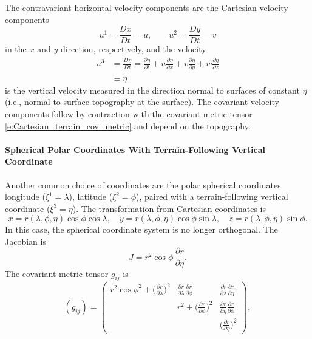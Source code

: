 \documentclass{report}
\begin{document}

The contravariant horizontal velocity components are the Cartesian velocity components 
\[
u^1 = \frac{Dx}{Dt} = u, \qquad u^2 = \frac{Dy}{Dt} = v
\]
in the $x$ and $y$ direction, respectively, and the velocity
\begin{align*}
u^3 & = \frac{D\eta}{Dt} 
 = \frac{\partial \eta}{\partial t} + u \frac{\partial \eta}{\partial x} + v \frac{\partial \eta}{\partial y} + w \frac{\partial \eta}{\partial z}\\
 & \equiv \dot \eta
\end{align*}
is the vertical velocity measured in the direction normal to surfaces of constant $\eta$ (i.e., normal to surface topography at the surface). The covariant velocity components follow by contraction with the covariant metric tensor \eqref{e:Cartesian_terrain_cov_metric} and depend on the topography.

\paragraph{Spherical Polar Coordinates With Terrain-Following Vertical Coordinate} Another common choice of coordinates are the polar spherical coordinates longitude ($\xi^1 = \lambda$), latitude ($\xi^2 = \phi$), paired with a terrain-following vertical coordinate ($\xi^3 = \eta$). 
The transformation from Cartesian coordinates is
\[
x = r(\lambda, \phi, \eta)\cos\phi\cos\lambda, \quad y=r(\lambda, \phi, \eta)\cos\phi\sin\lambda, \quad z=r(\lambda, \phi, \eta)\sin\phi.
\]
In this case, the spherical coordinate system is no longer orthogonal. The Jacobian is \citep{Staniforth03a}
\[
J=  r^2 \cos\phi \, \frac{\partial r}{\partial \eta}.
\]
The covariant metric tensor $g_{ij}$ is 
\begin{equation}\label{e:spherical_terrain_cov_metric}
    (g_{ij}) = \left(
    \begin{matrix}
    r^2\cos\phi^2 + \big(\frac{\partial r}{\partial \lambda}\big)^2 &
    \frac{\partial r}{\partial \lambda}\frac{\partial r}{\partial \phi}& 
    \frac{\partial r}{\partial \lambda}\frac{\partial r}{\partial \eta} \\
   & 
   r^2 + \big(\frac{\partial r}{\partial \phi}\big)^2& 
   \frac{\partial r}{\partial \eta}\frac{\partial r}{\partial \phi} \\
       & & \big(\frac{\partial r}{\partial \eta}\big)^2
    \end{matrix}
    \right),
\end{equation}
\end{document}
